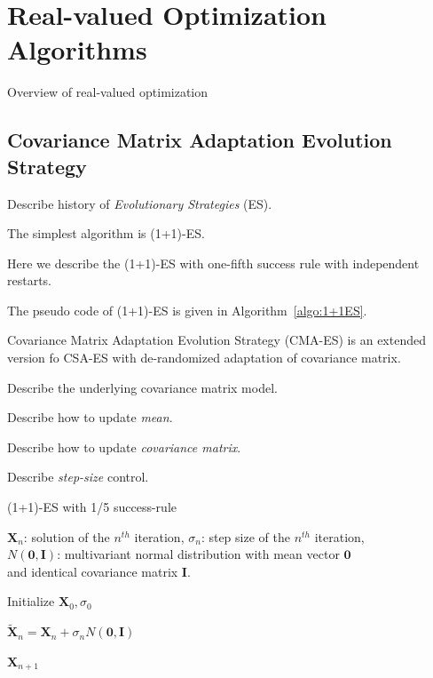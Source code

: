 \chapter{Real-valued Optimization Algorithms}
\label{chapter:algos}

Overview of real-valued optimization

\section{Covariance Matrix Adaptation Evolution Strategy}

Describe history of \textit{Evolutionary Strategies} (ES).

The simplest algorithm is (1+1)-ES.

Here we describe the (1+1)-ES with one-fifth success rule with independent restarts.

The pseudo code of (1+1)-ES is given in Algorithm~\ref{algo:1+1ES}.

Covariance Matrix Adaptation Evolution Strategy (CMA-ES) is an extended version fo CSA-ES with de-randomized adaptation of covariance matrix.

Describe the underlying covariance matrix model.

Describe how to update \textit{mean}.

Describe how to update \textit{covariance matrix}.

Describe \textit{step-size} control.



\begin{algorithm}%
\caption{(1+1)-ES with 1/5 success-rule}\label{algo:1+1ES}

$\boldsymbol{X}_{n}$: solution of the $n^{th}$ iteration, $\sigma_n$: step size of the $n^{th}$ iteration, \\
$N(\boldsymbol{0}, \boldsymbol{I})$: multivariant normal distribution with mean vector $\boldsymbol{0}$ \\ 
and identical covariance matrix $\boldsymbol{I}$.

\BlankLine
{} 

\BlankLine
Initialize $\boldsymbol{X}_0, \sigma_0$ \\
 {

    $\widetilde{\boldsymbol{X}}_n = \boldsymbol{X}_n + \sigma_n N(\boldsymbol{0}, \boldsymbol{I})$  \\

}

\Return $\boldsymbol{X}_{n+1}$

\end{algorithm}





